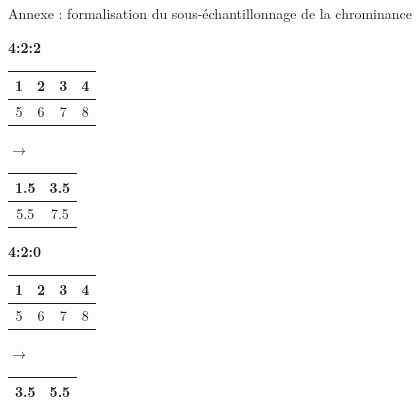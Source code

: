 \documentclass[xcolor=dvipsnames]{beamer}
\begin{document}
\begin{frame}{Annexe : formalisation du sous-échantillonnage de la chrominance}
    
    \begin{minipage}[t]{0.25\textwidth}
        \centering
        \small
        \textbf{4:2:2}
        \tiny
    \end{minipage}
    \hfill
    \begin{minipage}[t]{0.7\textwidth}
      \begin{tabular}{|c|c|c|c|}
        \hline
        1 & 2 & 3 & 4 \\
        \hline
        5 & 6 & 7 & 8 \\
        \hline
      \end{tabular}
        $ \rightarrow $
      \begin{tabular}{|c|c|}
        \hline
        1.5 & 3.5 \\
        \hline
        5.5 & 7.5 \\
        \hline
      \end{tabular}
    \end{minipage}
    
    \vspace{.6cm} %
    
    
    \begin{minipage}[t]{0.25\textwidth}
        \centering
        \small
        \textbf{4:2:0}
        \tiny
    \end{minipage}
    \hfill
    \begin{minipage}[t]{0.7\textwidth}
      \begin{tabular}{|c|c|c|c|}
        \hline
        1 & 2 & 3 & 4 \\
        \hline
        5 & 6 & 7 & 8 \\
        \hline
      \end{tabular}
        $ \rightarrow $
      \begin{tabular}{|c|c|}
        \hline
        3.5 & 5.5 \\
        \hline
      \end{tabular}
    \end{minipage}
    
\end{frame}
\end{document}
